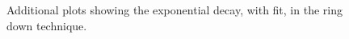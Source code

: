 \documentclass[a4paper]{report}
\numberwithin{equation}{section}
\begin{document}
\begin{figure}[h!]
	\centering
	\quad
	\centering
	\quad
	\centering
	\quad
	\centering
	\caption{Additional plots showing the exponential decay, with fit, in the ring down technique.}
\end{figure}
\end{document}
